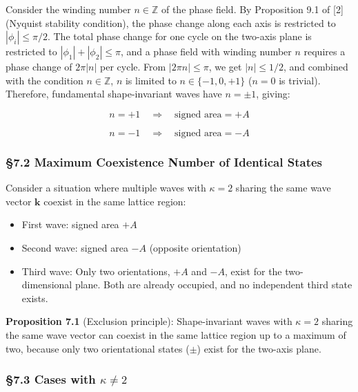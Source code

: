 \documentclass[
  a4paper,11pt]{article}
\providecommand{\tightlist}{%
  \setlength{\itemsep}{0pt}\setlength{\parskip}{0pt}}
\theoremstyle{definition}
\theoremstyle{remark}
\begin{document}
Consider the winding number \(n \in \mathbb{Z}\) of the phase field. By
Proposition 9.1 of {[}2{]} (Nyquist stability condition), the phase
change along each axis is restricted to \(|\phi_i| \leq \pi/2\). The
total phase change for one cycle on the two-axis plane is restricted to
\(|\phi_1| + |\phi_2| \leq \pi\), and a phase field with winding number
\(n\) requires a phase change of \(2\pi |n|\) per cycle. From
\(|2\pi n| \leq \pi\), we get \(|n| \leq 1/2\), and combined with the
condition \(n \in \mathbb{Z}\), \(n\) is limited to
\(n \in \{-1, 0, +1\}\) (\(n = 0\) is trivial). Therefore, fundamental
shape-invariant waves have \(n = \pm 1\), giving:

\[n = +1 \quad \Rightarrow \quad \text{signed area} = +A\]

\[n = -1 \quad \Rightarrow \quad \text{signed area} = -A\]

\subsubsection{§7.2 Maximum Coexistence Number of Identical
States}\label{maximum-coexistence-number-of-identical-states}

Consider a situation where multiple waves with \(\kappa = 2\) sharing
the same wave vector \(\mathbf{k}\) coexist in the same lattice region:

\begin{itemize}
\tightlist
\item
  First wave: signed area \(+A\)
\item
  Second wave: signed area \(-A\) (opposite orientation)
\item
  Third wave: Only two orientations, \(+A\) and \(-A\), exist for the
  two-dimensional plane. Both are already occupied, and no independent
  third state exists.
\end{itemize}

\textbf{Proposition 7.1} (Exclusion principle): Shape-invariant waves
with \(\kappa = 2\) sharing the same wave vector can coexist in the same
lattice region up to a maximum of two, because only two orientational
states (\(\pm\)) exist for the two-axis plane.

\subsubsection{\texorpdfstring{§7.3 Cases with
\(\kappa \neq 2\)}{§7.3 Cases with \textbackslash kappa \textbackslash neq 2}}\label{cases-with-kappa-neq-2}
\end{document}
